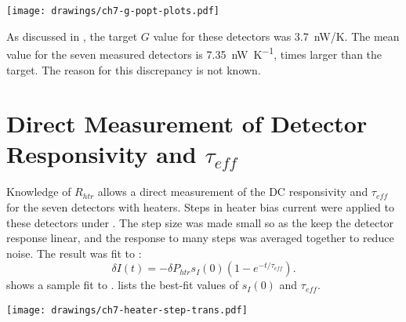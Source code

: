 \begin{figure*}
\texttt{[image: drawings/ch7-g-popt-plots.pdf]}
\caption{
Plots showing effect of $P_{opt}$ assumptions on $G$ and $T_c$ measurements.
\textbf{Left} Plot showing variation of $G$ for  vs assumed value of $P_{opt}$.
The statistical uncertainty in $G$ for this detector is approximately the same as the systematic uncertainty that results from the estimation of $P_{opt}$.
\textbf{Right} Plot showing variation of $T_c$ for  vs assumed value of $P_{opt}$.
In this case the systematic uncertainty is larger than the statistical uncertainty, although the change is only \SI{2.2}{\percent} as $P_{opt}$ increases from \SI{100}{\pW} to \SI{300}{\pW}.
The value of $n$ shows no trend with $P_{opt}$.
} 
\label{fig:heater-g-popt-plots}
\end{figure*}

As discussed in , the target $G$ value for these detectors was 3.7~nW/K.
The mean value for the seven measured detectors is \SI{7.35}{\nano\watt\per\kelvin},  times larger than the target.
The reason for this discrepancy is not known.

\section{Direct Measurement of Detector Responsivity and $\tau_{eff}$} \label{sec:teff-resp}

Knowledge of $R_{htr}$ allows a direct measurement of the DC responsivity and $\tau_{eff}$ for the seven detectors with heaters.
Steps in heater bias current were applied to these detectors under \SOC.
The step size was made small so as the keep the detector response linear, and the response to many steps was averaged together to reduce noise.
The result was fit to :
\begin{equation} \label{eqn:ch7-heater-step-trans}
  \delta I(t) = - \delta P_{htr} s_I(0) (1 - e^{-t/\tau_{eff}}).
\end{equation}
 shows a sample fit to .
 lists the best-fit values of $s_I(0)$ and $\tau_{eff}$.

\begin{figure*}
\centering
\texttt{[image: drawings/ch7-heater-step-trans.pdf]}
\caption{Plot showing response of detector  to step in applied heater power of \SI{1.41}{\pico\watt}.
Plots are for  biased into \SOC.
Data acquired at \SI{3125}{\Hz}.
The data averaged over 32 steps (16 up and 16 down), along with best fit to , are plotted.
The step in applied power begins at $t \approx \SI{0.6}{\ms}$, not $t = \SI{0}{\ms}$.
} 
\label{fig:ch7-heater-step-trans}
\end{figure*}

